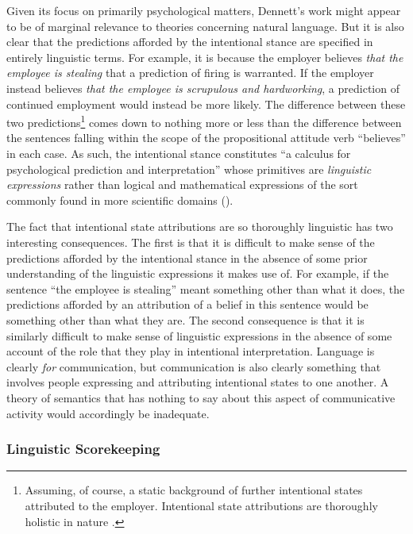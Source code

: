 Given its focus on primarily psychological matters, Dennett's work might appear to be of marginal relevance to theories concerning natural language. But it is also clear that the predictions afforded by the intentional stance are specified in entirely linguistic terms. For example, it is because the employer believes \textit{that the employee is stealing} that a prediction of firing is warranted. If the employer instead believes \textit{that the employee is scrupulous and hardworking}, a prediction of continued employment would instead be more likely. The difference between these two predictions\footnote{Assuming, of course, a static background of further intentional states attributed to the employer. Intentional state attributions are thoroughly holistic in nature \citep{Dennett:1987}.} comes down to nothing more or less than the difference between the sentences falling within the scope of the propositional attitude verb ``believes'' in each case. As such, the intentional stance constitutes ``a calculus for psychological prediction and interpretation'' whose primitives are \textit{linguistic expressions} rather than logical and mathematical expressions of the sort commonly found in more scientific domains (\citeyear[][p. 58]{Dennett:1987}).

The fact that intentional state attributions are so thoroughly linguistic has two interesting consequences. The first is that it is difficult to make sense of the predictions afforded by the intentional stance in the absence of some prior understanding of the linguistic expressions it makes use of. For example, if the sentence ``the employee is stealing'' meant something other than what it does, the predictions afforded by an attribution of a belief in this sentence would be something other than what they are. The second consequence is that it is similarly difficult to make sense of linguistic expressions in the absence of some account of the role that they play in intentional interpretation. Language is clearly \textit{for} communication, but communication is also clearly something that involves people expressing and attributing intentional states to one another. A theory of semantics that has nothing to say about this aspect of communicative activity would accordingly be inadequate. 

\subsubsection{Linguistic Scorekeeping}

